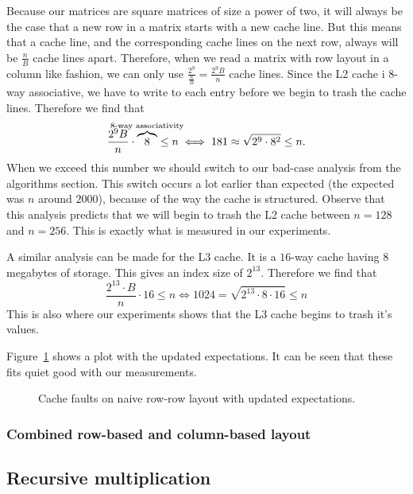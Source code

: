 Because our matrices are square matrices of size a power of two, it
will always be the case that a new row in a matrix starts with a new
cache line. But this means that a cache line, and the corresponding
cache lines on the next row, always will be $\frac{n}{B}$ cache lines
apart. Therefore, when we read a matrix with row layout in a column
like fashion, we can only use $\frac{2^9}{\frac{n}{B}} =
\frac{2^9B}{n}$ cache lines. Since the L2 cache i 8-way associative,
we have to write to each entry before we begin to trash the cache
lines. Therefore we find that
\[
\frac{2^9 B}{n} \cdot \overbrace{8}^{\mathclap{\text{8-way associativity}}} \leq n
\iff
181 \approx \sqrt{2^9 \cdot 8^2} \leq n.
\]
When we exceed this number we should switch to our bad-case analysis
from the algorithms section. This switch occurs a lot earlier than
expected (the expected was $n$ around $2000$), because of the way the
cache is structured. Observe that this analysis predicts that we will
begin to trash the L2 cache between $n = 128$ and $n = 256$. This is
exactly what is measured in our experiments.

A similar analysis can be made for the L3 cache. It is a $16$-way
cache having $8$ megabytes of storage. This gives an index size of
$2^{13}$. Therefore we find that
\[
\frac{2^{13} \cdot B}{n} \cdot 16 \leq n \iff 1024 = \sqrt{2^{13} \cdot 8 \cdot 16} \leq n
\]
This is also where our experiments shows that the L3 cache begins to
trash it's values.

Figure~\ref{fig:rowrowfixed} shows a plot with the updated
expectations. It can be seen that these fits quiet good with our
measurements.
\begin{figure}[h!]
  \centering
  \caption{Cache faults on naive row-row layout with updated
    expectations.}
  \label{fig:rowrowfixed}
\end{figure}

\subsubsection{Combined row-based and column-based layout}



\subsection{Recursive multiplication}

